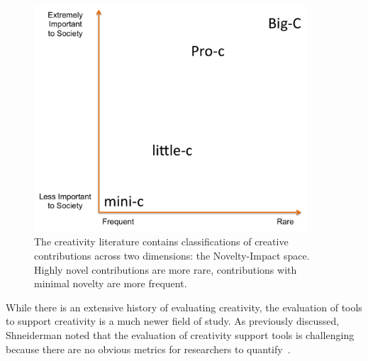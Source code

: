\begin{figure}[t]
\centering
\includegraphics[width=4in]{images/spectrum.png}
\caption[Novelty-Impact Space of Creativity (Along with some extra text that makes multiple lines)]{The creativity literature contains classifications of creative contributions across two dimensions: the Novelty-Impact space. Highly novel contributions are more rare, contributions with minimal novelty are more frequent.}
\label{NIspace}
\end{figure}

\label{CSTEvaluation}
While there is an extensive history of evaluating creativity, the evaluation of tools to support creativity is a much newer field of study. As previously discussed, Shneiderman noted that the evaluation of creativity support tools is challenging because there are no obvious metrics for researchers to quantify~\cite{Shneiderman:2007wp}. 
